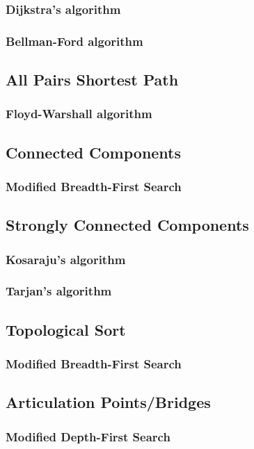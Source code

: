\documentclass[11pt,a4paper,titlepage]{article}
\begin{document}
			\subsubsection{Dijkstra's algorithm}
			\subsubsection{Bellman-Ford algorithm}
		\subsection{All Pairs Shortest Path}
			\subsubsection{Floyd-Warshall algorithm}
		\subsection{Connected Components}
			\subsubsection{Modified Breadth-First Search}
		\subsection{Strongly Connected Components}
			\subsubsection{Kosaraju's algorithm}
			\subsubsection{Tarjan's algorithm}
		\subsection{Topological Sort}
			\subsubsection{Modified Breadth-First Search}
		\subsection{Articulation Points/Bridges}
			\subsubsection{Modified Depth-First Search}
\end{document}
